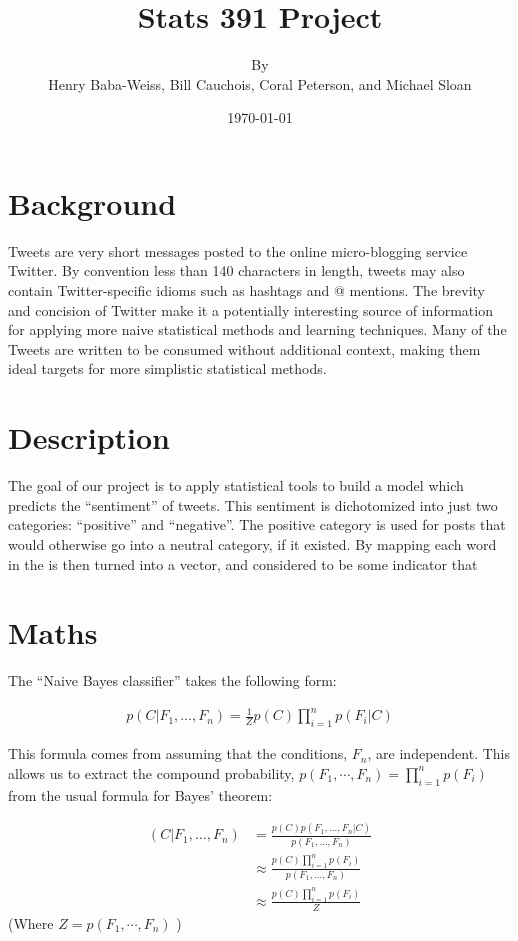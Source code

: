 \documentclass[12pt,a4paper]{article}
\title{Stats 391 Project}
\author{By \\ Henry Baba-Weiss, Bill Cauchois, Coral Peterson, and Michael Sloan}
\date{\today}
\begin{document}
\maketitle
\pagebreak

\section { Background }

Tweets are very short messages posted to the online micro-blogging service Twitter. By convention less than 140 characters in length, tweets may also contain Twitter-specific idioms such as hashtags and @ mentions.  The brevity and concision of Twitter make it a potentially interesting source of information for applying more naive statistical methods and learning techniques.  Many of the Tweets are written to be consumed without additional context, making them ideal targets for more simplistic statistical methods.

\section { Description }

The goal of our project is to apply statistical tools to build a model which predicts the ``sentiment'' of tweets.  This sentiment is dichotomized into just two categories: ``positive'' and ``negative''.  The positive category is used for posts that would otherwise go into a neutral category, if it existed.  By mapping each word in the  is then turned into a vector, and considered to be some indicator that %


\section { Maths }

The ``Naive Bayes classifier'' takes the following form:

\begin{align*}
p(C \vert F_1,\dots,F_n) = \frac{1}{Z}  p(C) \prod_{i=1}^n p(F_i \vert C)
\end{align*}

This formula comes from assuming that the conditions, $ F_n $, are independent.  This allows us to extract the compound probability, $ p(F_1,\cdots,F_n) = \prod_{i=1}^n p(F_i) $ from the usual formula for Bayes' theorem:

\begin{align*}
(C \vert F_1,\dots,F_n) & = \frac{p(C) p(F_1,\dots,F_n\vert C)}{p(F_1,\dots,F_n)}    \\
                        & \approx \frac{p(C) \prod_{i=1}^n p(F_i)}{p(F_1,\dots,F_n)} \\
                        & \approx \frac{p(C) \prod_{i=1}^n p(F_i)}{Z}
\end{align*}
(Where $ Z = p(F_1,\cdots,F_n) $ )
\end{document}

